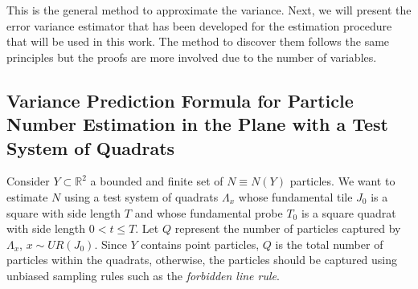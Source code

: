 \vspace{2mm}

This is the general method to approximate the variance. Next, we will present the error variance estimator that has been developed for the estimation procedure that will be used in this work. The method to discover them follows the same principles but the proofs are more involved due to the number of variables.\\


\subsection{Variance Prediction Formula for Particle Number Estimation in the Plane with a Test System of Quadrats}

Consider $Y\subset \mathbb{R}^2$ a bounded and finite set of $N\equiv N(Y)$ particles. We want to estimate $N$ using a test system of quadrats $\Lambda_x$ whose fundamental tile $J_0$ is a square with side length $T$ and whose fundamental probe $T_0$ is a square quadrat with side length $0<t\leq T$. Let $Q$ represent the number of particles captured by $\Lambda_x$, $x\sim UR(J_0)$. Since $Y$ contains point particles, $Q$ is the total number of particles within the quadrats, otherwise, the particles should be captured using unbiased sampling rules such as the \textit{forbidden line rule}.\\


